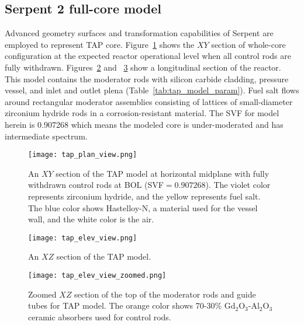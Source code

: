 \subsection{Serpent 2 full-core model} \label{sec:tap_model}
Advanced geometry surfaces and transformation capabilities of Serpent 
\cite{leppanen_serpent_2013} are employed to represent \gls{TAP} core. 
Figure~\ref{fig:tap-serpent-plan} shows the $XY$ section of whole-core
configuration at the expected reactor operational level when all
control rods are fully withdrawn. Figures~\ref{fig:tap-serpent-elev} and 
~\ref{fig:tap-serpent-elev-zoom} show a longitudinal section of the reactor. 
This model contains the moderator rods with silicon carbide cladding, pressure 
vessel, and inlet and outlet plena (Table~\ref{tab:tap_model_param}). Fuel 
salt flows around rectangular moderator assemblies consisting of lattices of 
small-diameter zirconium hydride rods in a corrosion-resistant material. The 
\gls{SVF} for model herein is 0.907268 which means the modeled core is 
under-moderated and has intermediate spectrum.
\begin{figure}[htp!] %
	\centering
	\texttt{[image: tap\_plan\_view.png]}
	\caption{An $XY$ section of the \gls{TAP} model at horizontal midplane 
		with fully withdrawn control rods at \gls{BOL} (\gls{SVF}$=0.907268$). 
		The violet color represents zirconium 
		hydride, and the yellow represents fuel salt. The blue color shows 
		Hastelloy-N, a material used for the vessel wall, and the white color 
		is the air.}
	\label{fig:tap-serpent-plan}
\end{figure}
\begin{figure}[htp!] %
	\centering
	\texttt{[image: tap\_elev\_view.png]}
	\caption{An $XZ$ section of the \gls{TAP} model.}
	\label{fig:tap-serpent-elev}
\end{figure}
\begin{figure}[htp!] %
	\centering
	\texttt{[image: tap\_elev\_view\_zoomed.png]}
	\caption{Zoomed $XZ$ section of the top of the moderator rods and guide 
	tubes for \gls{TAP} model. The orange color shows 70-30\%  
	Gd$_2$O$_3$-Al$_2$O$_3$ ceramic absorbers used for control rods.}
	\label{fig:tap-serpent-elev-zoom}
\end{figure}

